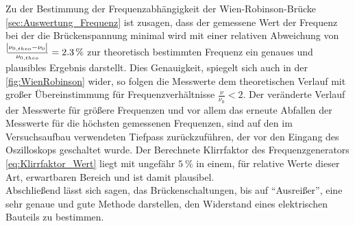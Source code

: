 Zu der Bestimmung der Frequenzabhängigkeit der Wien-Robinson-Brücke \cref{sec:Auswertung_Frequenz} ist zusagen, dass
der gemessene Wert der Frequenz bei der die Brückenspannung minimal wird mit einer relativen Abweichung 
von $\tfrac{\envert{\nu_{0,theo} - \nu_{0}}}{\nu_{0, theo}} = \SI{2.3}{\percent}$ zur theoretisch bestimmten 
Frequenz ein genaues und plausibles Ergebnis darstellt.
Dies Genauigkeit, spiegelt sich auch in der \cref{fig:WienRobinson} wider, so folgen die Messwerte dem 
theoretischen Verlauf mit großer Übereinstimmung für Frequenzverhältnisse $\frac{\nu}{\nu_{0}} < 2$. 
Der veränderte Verlauf der Messwerte für größere Frequenzen und vor allem das erneute Abfallen der Messwerte 
für die höchsten gemessenen Frequenzen, sind auf den im Versuchsaufbau verwendeten Tiefpass zurückzuführen,
der vor den Eingang des Oszilloskops geschaltet wurde.
Der Berechnete Klirrfaktor des Frequenzgenerators \cref{eq:Klirrfaktor_Wert} liegt mit 
ungefähr $\SI{5}{\percent}$ in einem, für 
relative Werte dieser Art, erwartbaren Bereich und ist damit plausibel. \\

Abschließend lässt sich sagen, das Brückenschaltungen, bis auf \enquote{Ausreißer}, eine sehr genaue und gute Methode
darstellen, den Widerstand eines elektrischen Bauteils zu bestimmen. 